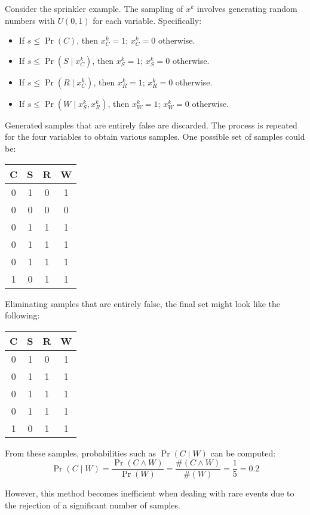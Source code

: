 \begin{example}
    Consider the sprinkler example. 
    The sampling of $x^k$ involves generating random numbers with $U(0,1)$ for each variable.
    Specifically:
    \begin{itemize}
        \item If $s\leq\Pr(C)$, then $x_C^k=1$; $x_C^k=0$ otherwise. 
        \item If $s\leq\Pr(S\mid x_C^k)$, then $x_S^k=1$; $x_S^k=0$ otherwise. 
        \item If $s\leq\Pr(R\mid x_C^k)$, then $x_R^k=1$; $x_R^k=0$ otherwise. 
        \item If $s\leq\Pr(W\mid x_S^k,x_R^k)$, then $x_W^k=1$; $x_W^k=0$ otherwise. 
    \end{itemize}
    Generated samples that are entirely false are discarded. 
    The process is repeated for the four variables to obtain various samples. 
    One possible set of samples could be:
    \begin{table}[H]
        \centering
        \begin{tabular}{cccc}
        \hline
        \textbf{C} & \textbf{S} & \textbf{R} & \textbf{W} \\ \hline
        0          & 1          & 0          & 1          \\
        0          & 0          & 0          & 0          \\
        0          & 1          & 1          & 1          \\
        0          & 1          & 1          & 1          \\
        0          & 1          & 1          & 1          \\
        1          & 0          & 1          & 1          \\ \hline
        \end{tabular}
    \end{table}
    Eliminating samples that are entirely false, the final set might look like the following:
    \begin{table}[H]
        \centering
        \begin{tabular}{cccc}
        \hline
        \textbf{C} & \textbf{S} & \textbf{R} & \textbf{W} \\ \hline
        0          & 1          & 0          & 1          \\
        0          & 1          & 1          & 1          \\
        0          & 1          & 1          & 1          \\
        0          & 1          & 1          & 1          \\
        1          & 0          & 1          & 1          \\ \hline
        \end{tabular}
    \end{table}
    From these samples, probabilities such as $\Pr(C\mid W)$ can be computed:
    \[\Pr(C\mid W)=\dfrac{\Pr(C \land W)}{\Pr(W)}=\dfrac{\# (C \land W)}{\#(W)}=\dfrac{1}{5}=0.2\]
\end{example}
However, this method becomes inefficient when dealing with rare events due to the rejection of a significant number of samples.

